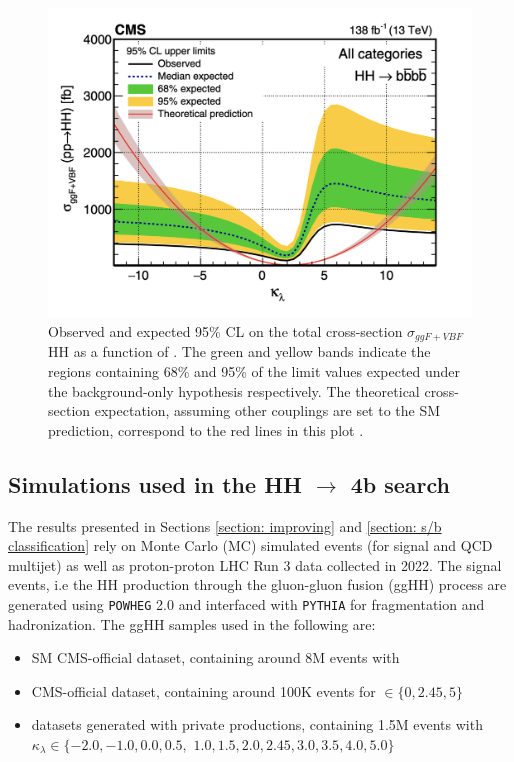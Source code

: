 \begin{figure}
    \centering
    \includegraphics[width=0.7\linewidth]{Images/4.HH4b Analysis/DHH method/kl run 2 result.png}
    \caption{Observed and expected 95\% CL on the total cross-section $\sigma_{ggF+VBF}$ HH as a function of \kl. The green and yellow bands indicate the regions containing 68\% and 95\% of the limit values expected under the background-only hypothesis respectively. The theoretical cross-section expectation, assuming other couplings are set to the SM prediction, correspond to the red lines in this plot \cite{Run2res}.}
    \label{fig: run 2 result kl}
\end{figure}

\subsection{Simulations used in the HH $\to$ 4b search} \label{subsection: samples}

The results presented in Sections \ref{section: improving} and \ref{section: s/b classification} rely on Monte Carlo (MC) simulated events (for signal and QCD multijet) as well as proton-proton LHC Run 3 data collected in 2022. The signal events, i.e the HH production through the gluon-gluon fusion (ggHH) process are generated using \texttt{POWHEG} 2.0 \cite{Powheg} and interfaced with \texttt{PYTHIA} \cite{Pythia} for fragmentation and hadronization. The ggHH samples used in the following are:
\begin{itemize}
    \item SM CMS-official dataset, containing around 8M events with 
    \item \kl CMS-official dataset, containing around 100K events for \kl $\in \{0,2.45,5\}$
    \item \kl datasets generated with private productions, containing 1.5M events with $\kappa_\lambda 
\in \{-2.0, -1.0, 0.0, 0.5,$ $ 1.0, 1.5, 2.0, 2.45, 3.0, 3.5, 4.0, 5.0\} $
\end{itemize}

